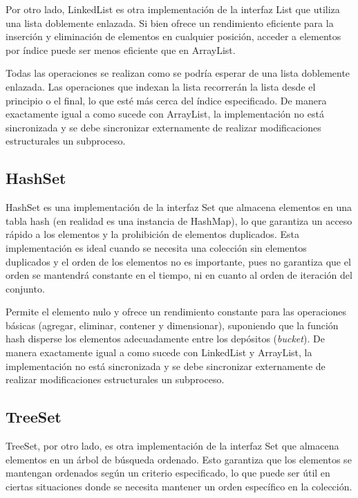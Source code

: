 \documentclass[a4paper,12pt]{article}
\begin{document}
Por otro lado, LinkedList es otra implementación de la interfaz List que utiliza una lista doblemente enlazada. Si bien ofrece un rendimiento eficiente para la inserción y eliminación de elementos en cualquier posición, acceder a elementos por índice puede ser menos eficiente que en ArrayList.

Todas las operaciones se realizan como se podría esperar de una lista doblemente enlazada. Las operaciones que indexan la lista recorrerán la lista desde el principio o el final, lo que esté más cerca del índice especificado.\cite{linked_list} De manera exactamente igual a como sucede con ArrayList, la implementación no está sincronizada y se debe sincronizar externamente de realizar modificaciones estructurales un subproceso.

\subsection{HashSet}

HashSet es una implementación de la interfaz Set que almacena elementos en una tabla hash (en realidad es una instancia de HashMap), lo que garantiza un acceso rápido a los elementos y la prohibición de elementos duplicados. Esta implementación es ideal cuando se necesita una colección sin elementos duplicados y el orden de los elementos no es importante, pues no garantiza que el orden se mantendrá constante en el tiempo, ni en cuanto al orden de iteración del conjunto.

Permite el elemento nulo y ofrece un rendimiento constante para las operaciones básicas (agregar, eliminar, contener y dimensionar), suponiendo que la función hash disperse los elementos adecuadamente entre los depósitos (\textit{bucket}). De manera exactamente igual a como sucede con LinkedList y ArrayList, la implementación no está sincronizada y se debe sincronizar externamente de realizar modificaciones estructurales un subproceso. \cite{hash_set}

\subsection{TreeSet}

TreeSet, por otro lado, es otra implementación de la interfaz Set que almacena elementos en un árbol de búsqueda ordenado. Esto garantiza que los elementos se mantengan ordenados según un criterio especificado, lo que puede ser útil en ciertas situaciones donde se necesita mantener un orden específico en la colección.
\end{document}

